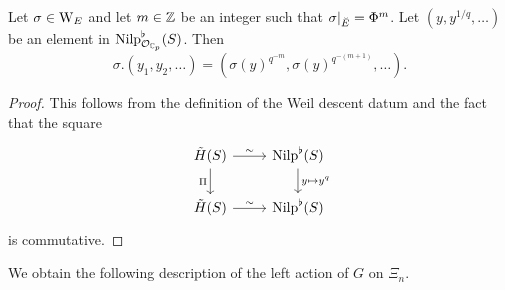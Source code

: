 \documentclass[../main.tex]{subfiles}
\begin{document}
\begin{lem}\label{lem:ExplicitWeilGroupActionOnTildeH}
  Let $\sigma \in \mathrm W_E$ and let $m \in \mathbb{Z}$ be an integer such that
  $\sigma|_{\breve {E}} = \Phi^m$. Let $(y, y^{1/q}, \dots)$ be an element in
  ${\mathrm{Nilp}}_{\mathcal{O}_{\mathbb{C}_p}}^\flat(S)$.
  Then
  \begin{equation*}
    \sigma.(y_1, y_2, \dots) = (\sigma(y)^{q^{-m}}, \sigma(y)^{q^{-(m+1)}}, \dots).
  \end{equation*}
\begin{proof}
  This follows from the definition of the Weil descent datum and the fact that 
  the square
  \begin{equation*}
    \begin{tikzcd}[ampersand replacement=\&]
    	{\tilde H(S)} \& {\Nilp^\flat(S)} \\
    	{\tilde H(S)} \& {\Nilp^\flat(S)}
    	\arrow["\sim", from=1-1, to=1-2]
    	\arrow["\Pi"', from=1-1, to=2-1]
    	\arrow["{y \mapsto y^q}", from=1-2, to=2-2]
    	\arrow["\sim", from=2-1, to=2-2]
    \end{tikzcd}
  \end{equation*}
  is commutative.
\end{proof}
\end{lem}

We obtain the following description of the left action of $G$ on $\Xi_n$.
\end{document}
